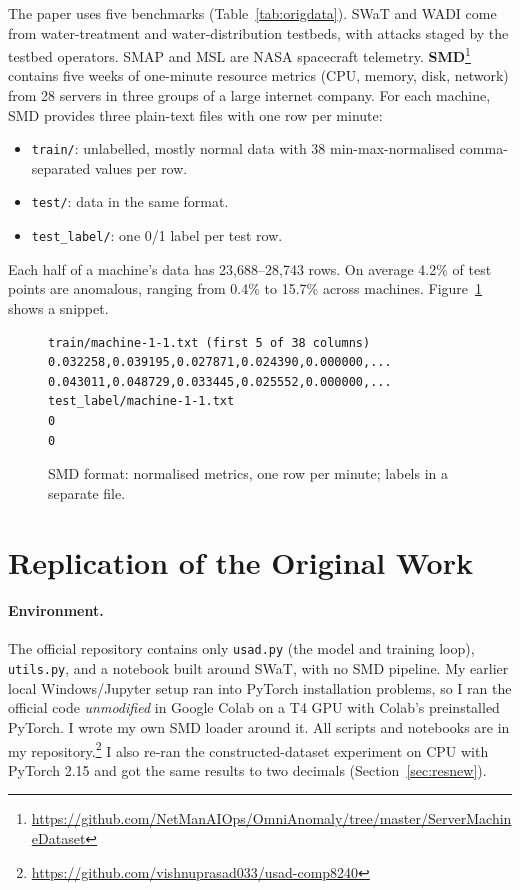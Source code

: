 \documentclass[11pt]{article}
\newcommand{\repourl}{https://github.com/vishnuprasad033/usad-comp8240}
\begin{document}
The paper uses five benchmarks (Table~\ref{tab:origdata}). SWaT and WADI come from water-treatment and water-distribution testbeds, with attacks staged by the testbed operators. SMAP and MSL are NASA spacecraft telemetry. \textbf{SMD}\footnote{\url{https://github.com/NetManAIOps/OmniAnomaly/tree/master/ServerMachineDataset}} contains five weeks of one-minute resource metrics (CPU, memory, disk, network) from 28 servers in three groups of a large internet company. For each machine, SMD provides three plain-text files with one row per minute:
\begin{itemize}
\item \texttt{train/}: unlabelled, mostly normal data with 38 min-max-normalised comma-separated values per row.
\item \texttt{test/}: data in the same format.
\item \texttt{test\_label/}: one 0/1 label per test row.
\end{itemize}
Each half of a machine's data has 23,688--28,743 rows. On average 4.2\% of test points are anomalous, ranging from 0.4\% to 15.7\% across machines. Figure~\ref{fig:snip-smd} shows a snippet.

\begin{figure}[t]
\centering
\scriptsize
\begin{verbatim}
train/machine-1-1.txt (first 5 of 38 columns)
0.032258,0.039195,0.027871,0.024390,0.000000,...
0.043011,0.048729,0.033445,0.025552,0.000000,...
test_label/machine-1-1.txt
0
0
\end{verbatim}
\vspace{-1.5em}
\caption{SMD format: normalised metrics, one row per minute; labels in a separate file.}
\label{fig:snip-smd}
\end{figure}

\section{Replication of the Original Work}
\label{sec:repl}

\paragraph{Environment.} The official repository contains only \texttt{usad.py} (the model and training loop), \texttt{utils.py}, and a notebook built around SWaT, with no SMD pipeline. My earlier local Windows/Jupyter setup ran into PyTorch installation problems, so I ran the official code \emph{unmodified} in Google Colab on a T4 GPU with Colab's preinstalled PyTorch. I wrote my own SMD loader around it. All scripts and notebooks are in my repository.\footnote{\url{\repourl}} I also re-ran the constructed-dataset experiment on CPU with PyTorch 2.15 and got the same results to two decimals (Section~\ref{sec:resnew}).
\end{document}
